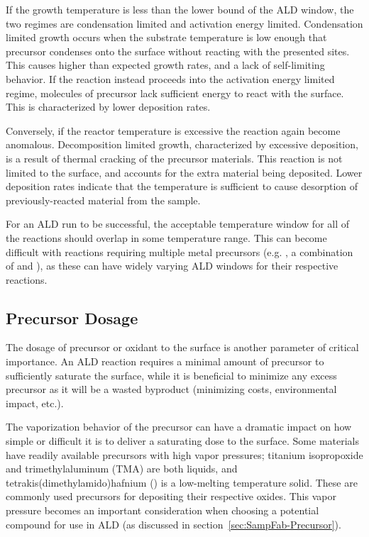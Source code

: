 If the growth temperature is less than the lower bound of the ALD window, the two regimes are condensation limited and activation energy limited. Condensation limited growth occurs when the substrate temperature is low enough that precursor condenses onto the surface without reacting with the presented sites. This causes higher than expected growth rates, and a lack of self-limiting behavior. If the reaction instead proceeds into the activation energy limited regime, molecules of precursor lack sufficient energy to react with the surface. This is characterized by lower deposition rates. 

Conversely, if the reactor temperature is excessive the reaction again become anomalous. Decomposition limited growth, characterized by excessive deposition, is a result of thermal cracking of the precursor materials. This reaction is not limited to the surface, and accounts for the extra material being deposited. Lower deposition rates indicate that the temperature is sufficient to cause desorption of previously-reacted material from the sample. 

For an ALD run to be successful, the acceptable temperature window for all of the reactions should overlap in some temperature range. This can become difficult with reactions requiring multiple metal precursors (e.g. \PTO, a combination of  and ), as these can have widely varying ALD windows for their respective reactions. 


\subsection{Precursor Dosage}

The dosage of precursor or oxidant to the surface is another parameter of critical importance. An ALD reaction requires a minimal amount of precursor to sufficiently saturate the surface, while it is beneficial to minimize any excess precursor as it will be a wasted byproduct (minimizing costs, environmental impact, etc.). 

The vaporization behavior of the precursor can have a dramatic impact on how simple or difficult it is to deliver a saturating dose to the surface. Some materials have readily available precursors with high vapor pressures; titanium isopropoxide and trimethylaluminum (TMA) are both liquids, and tetrakis(dimethylamido)hafnium () is a low-melting temperature solid. These are commonly used precursors for depositing their respective oxides. This vapor pressure becomes an important consideration when choosing a potential compound for use in ALD (as discussed in section~\vref{sec:SampFab-Precursor}).


